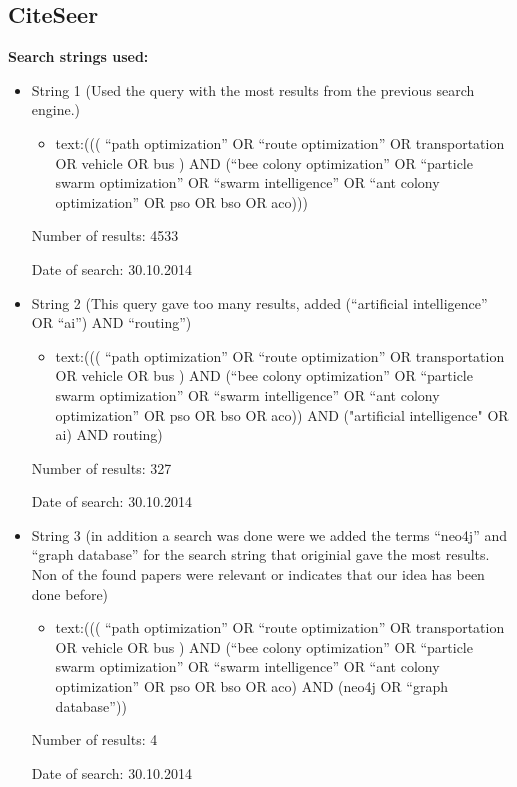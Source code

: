 \subsection{CiteSeer}
\textbf{Search strings used:}
\begin{itemize}
\item String 1 (Used the query with the most results from the previous search engine.)
\begin{itemize}
\item text:((( ``path optimization'' OR ``route optimization'' OR transportation OR vehicle OR bus ) AND (``bee colony optimization'' OR ``particle swarm optimization'' OR ``swarm intelligence'' OR ``ant colony optimization'' OR pso OR bso OR aco)))
\end{itemize}
\par
Number of results: 4533
\par
Date of search: 30.10.2014
\end{itemize}
\begin{itemize}
\item String 2 (This query gave too many results, added (``artificial intelligence'' OR ``ai'') AND ``routing'')
\begin{itemize}
\item text:((( ``path optimization'' OR ``route optimization'' OR transportation OR vehicle OR bus ) AND (``bee colony optimization'' OR ``particle swarm optimization'' OR ``swarm intelligence'' OR ``ant colony optimization'' OR pso OR bso OR aco)) AND ("artificial intelligence" OR ai) AND routing)
\end{itemize}
\par
Number of results: 327
\par
Date of search: 30.10.2014
\end{itemize}
\begin{itemize}
\item String 3  (in addition a search was done were we added the terms ``neo4j'' and ``graph database'' for the search string that originial gave the most results. Non of the found papers were relevant or indicates that our idea has been done before)
\begin{itemize}
\item text:((( ``path optimization'' OR ``route optimization'' OR transportation OR vehicle OR bus ) AND (``bee colony optimization'' OR ``particle swarm optimization'' OR ``swarm intelligence'' OR ``ant colony optimization'' OR pso OR bso OR aco) AND (neo4j OR ``graph database''))
\end{itemize}
\par
Number of results: 4 
\par
Date of search: 30.10.2014
\end{itemize}



